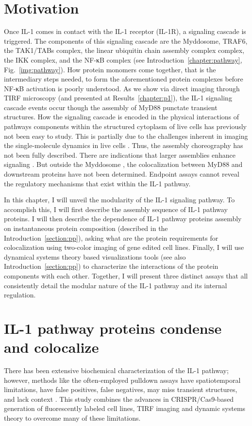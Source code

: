 \section{Motivation}
Once IL-1 comes in contact with the IL-1 receptor (IL-1R), a signaling cascade is triggered. The components of this signaling cascade are the Myddosome, TRAF6, the TAK1/TABs complex, the linear ubiquitin chain assembly complex complex, the IKK complex, and the NF-κB complex (see Introduction~\ref{chapter:pathway}, Fig.~\ref{img:pathway}). How protein monomers come together, that is the intermediary steps needed, to form the aforementioned protein complexes before NF-κB activation is poorly understood. As we show via direct imaging through TIRF microscopy (and presented at Results~\ref{chapter:p1}), the IL-1 signaling cascade events occur though the assembly of MyD88 punctate transient structures. How the signaling cascade is encoded in the physical interactions of pathways components within the structured cytoplasm of live cells has previously not been easy to study. This is partially due to the challenges inherent in imaging the single-molecule dynamics in live cells \autocite{Liu_2015}. Thus, the assembly choreography has not been fully described. There are indications that larger assemblies enhance signaling \autocite{Latty_2018}\autocite{Deliz-Aguirre_2021}\autocite{Cao_2023}. But outside the Myddosome \autocite{Deliz-Aguirre_2021}, the colocalization between MyD88 and downstream proteins have not been determined. Endpoint assays cannot reveal the regulatory mechanisms that exist within the IL-1 pathway.

In this chapter, I will unveil the modularity of the IL-1 signaling pathway. To accomplish this, I will first describe the assembly sequence of IL-1 pathway proteins. I will then describe the dependence of IL-1 pathway proteins assembly on instantaneous protein composition (described in the Introduction~\ref{section:pp}), asking what are the protein requirements for colocalization using two-color imaging of gene edited cell lines. Finally, I will use dynamical systems theory based visualizations tools (see also Introduction~\ref{section:pp}) to characterize the interactions of the protein components with each other. Together, I will present three distinct assays that all consistently detail the modular nature of the IL-1 pathway and its internal regulation.

\section{IL-1 pathway proteins condense and colocalize}
There has been extensive biochemical characterization of the IL-1 pathway; however, methods like the often-employed pulldown assays have spatiotemporal limitations, have false positives, false negatives, may miss transient structures, and lack context \autocite{Ghavidel_2005}\autocite{Perry_2019}\autocite{Tabar_2022}. This study combines the advances in CRISPR/Cas9-based generation of fluorescently labeled cell lines, TIRF imaging and dynamic systems theory to overcome many of these limitations.

